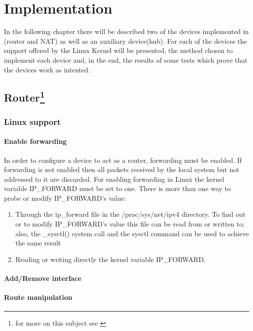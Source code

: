 \chapter{Implementation}
\label{chapter:impl}
In the following chapter there will be described two of the devices implemented in \project(router and NAT) as well as an auxiliary device(hub). For each of the devices the support offered by the Linux Kernel will be presented, the method chosen to implement each device and, in the end, the results of some tests which prove that the devices work as intented.

\section[Router]{Router\footnote{for more on this subject see \cite{linnetarch}}}
\label{sec:router-impl}

\subsection{Linux support}
\label{sub-sec:router-linux}

\subsubsection{Enable forwarding}
In order to configure a device to act as a router, forwarding must be enabled. If forwarding is not enabled then all packets received by the local system but not addressed to it are discarded. 
For enabling forwarding in Linux the kernel variable IP_FORWARD must be set to one. There is more than one way to probe or modify IP_FORWARD's value:
\renewcommand{\theenumi}{\alph{enumi}}
\begin{enumerate}
\item Through the ip_forward file in the /proc/sys/net/ipv4 directory. To find out or to modify IP_FORWARD's value this file can be read from or written to; also, the _sysctl() system call and the sysctl command can be used to achieve the same result 
\item Reading or writing directly the kernel variable IP_FORWARD. 
\end{enumerate}
\renewcommand{\theenumi}{\arabic{enumi}}

\subsubsection{Add/Remove interface}


\subsubsection{Route manipulation}


